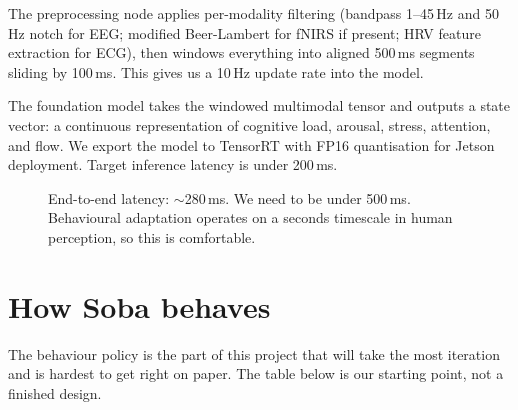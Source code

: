 \documentclass[11pt,a4paper]{article}
\begin{document}
The preprocessing node applies per-modality filtering (bandpass 1--45\,Hz and 50\,Hz notch for EEG; modified Beer-Lambert for fNIRS if present; HRV feature extraction for ECG), then windows everything into aligned 500\,ms segments sliding by 100\,ms. This gives us a 10\,Hz update rate into the model.

The foundation model takes the windowed multimodal tensor and outputs a state vector: a continuous representation of cognitive load, arousal, stress, attention, and flow. We export the model to TensorRT with FP16 quantisation for Jetson deployment. Target inference latency is under 200\,ms.

\begin{figure}[H]
\centering
{}
\caption{End-to-end latency: $\sim$280\,ms. We need to be under 500\,ms. Behavioural adaptation operates on a seconds timescale in human perception, so this is comfortable.}
\end{figure}

\section{How Soba behaves}

The behaviour policy is the part of this project that will take the most iteration and is hardest to get right on paper. The table below is our starting point, not a finished design.
\end{document}
